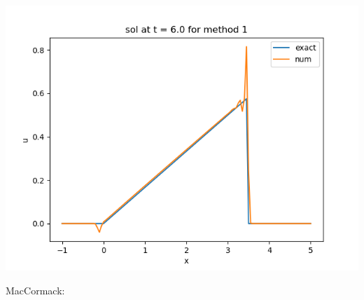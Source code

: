 \documentclass{article}
\begin{document}
\begin{center}
	\includegraphics[scale=.3]{hw13 sol t = 6 method 1}
\end{center}
MacCormack:
\end{document}
